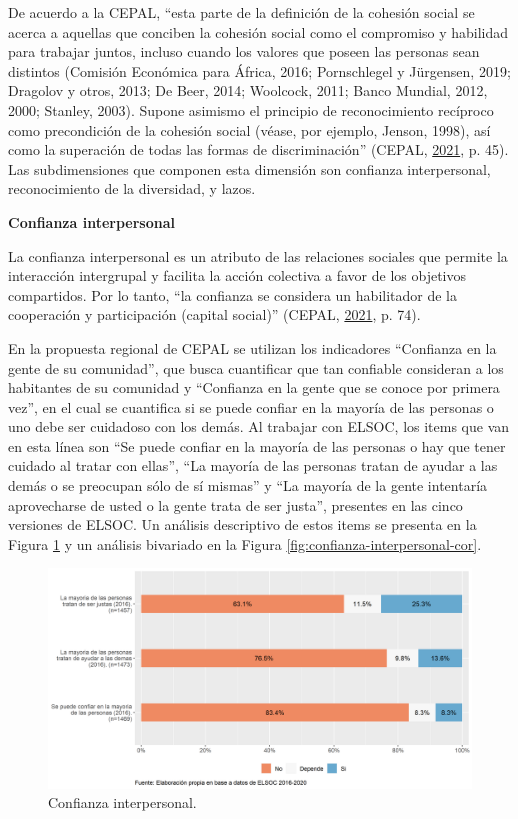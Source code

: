 \documentclass[
  12pt,
]{book}
\begin{document}
De acuerdo a la CEPAL, ``esta parte de la definición de la cohesión social se acerca a aquellas que conciben la cohesión social como el compromiso y habilidad para trabajar juntos, incluso cuando los valores que poseen las personas sean distintos (Comisión Económica para África, 2016; Pornschlegel y Jürgensen, 2019; Dragolov y otros, 2013; De Beer, 2014; Woolcock, 2011; Banco Mundial, 2012, 2000; Stanley, 2003). Supone asimismo el principio de reconocimiento recíproco como precondición de la cohesión social (véase, por ejemplo, Jenson, 1998), así como la superación de todas las formas de discriminación'' (CEPAL, \protect\hyperlink{ref-cepal_cohesion_2021}{2021}, p. 45). Las subdimensiones que componen esta dimensión son confianza interpersonal, reconocimiento de la diversidad, y lazos.

\textbf{Confianza interpersonal}

La confianza interpersonal es un atributo de las relaciones sociales que permite la interacción intergrupal y facilita la acción colectiva a favor de los objetivos compartidos. Por lo tanto, ``la confianza se considera un habilitador de la cooperación y participación (capital social)'' (CEPAL, \protect\hyperlink{ref-cepal_cohesion_2021}{2021}, p. 74).

En la propuesta regional de CEPAL se utilizan los indicadores ``Confianza en la gente de su comunidad'', que busca cuantificar que tan confiable consideran a los habitantes de su comunidad y ``Confianza en la gente que se conoce por primera vez'', en el cual se cuantifica si se puede confiar en la mayoría de las personas o uno debe ser cuidadoso con los demás. Al trabajar con ELSOC, los items que van en esta línea son ``Se puede confiar en la mayoría de las personas o hay que tener cuidado al tratar con ellas'', ``La mayoría de las personas tratan de ayudar a las demás o se preocupan sólo de sí mismas'' y ``La mayoría de la gente intentaría aprovecharse de usted o la gente trata de ser justa'', presentes en las cinco versiones de ELSOC. Un análisis descriptivo de estos items se presenta en la Figura \ref{fig:confianza-interpersonal} y un análisis bivariado en la Figura \ref{fig:confianza-interpersonal-cor}.

\begin{figure}[H]

{\centering \includegraphics[width=1\linewidth,height=1\textheight]{output/graphs/confianza-interpersonal} 

}

\caption{Confianza interpersonal.}\label{fig:confianza-interpersonal}
\end{figure}
\end{document}
